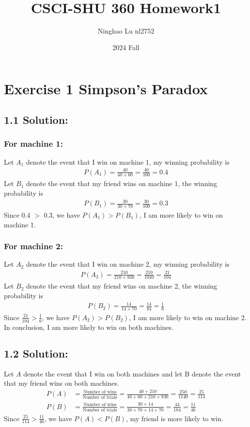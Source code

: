 \documentclass{article}
\title{CSCI-SHU 360 Homework1}
\author{Ninghao Lu nl2752}
\date{2024 Fall}
\begin{document}
\maketitle

\section*{Exercise 1 Simpson's Paradox}
\subsection*{1.1 Solution:}
\subsubsection*{For machine 1:}
Let $A_1$ denote the event that I win on machine 1, my winning probability is 
\begin{align*}
    P(A_1) = \frac{40}{40 + 60} = \frac{40}{100} = 0.4
\end{align*}
Let $B_1$ denote the event that my friend wins on machine 1, the winning probability is 
\begin{align*}
    P(B_1) = \frac{30}{30 + 70} = \frac{30}{100} = 0.3
\end{align*}
Since 0.4 $>$ 0.3, we have $P(A_1) > P(B_1)$, I am more likely to win on machine 1.
\subsubsection*{For machine 2:}
Let $A_2$ denote the event that I win on machine 2, my winning probability is 
\begin{align*}
    P(A_2) = \frac{210}{210 + 830} = \frac{210}{1040} = \frac{21}{104}
\end{align*}
Let $B_2$ denote the event that my friend wins on machine 2, the winning probability is 
\begin{align*}
    P(B_2) = \frac{14}{14 + 70} = \frac{14}{84} = \frac{1}{6}
\end{align*}
Since $\frac{21}{104} > \frac{1}{6}$, we have $P(A_2) > P(B_2)$, I am more likely to win on machine 2.\\
In conclusion, I am more likely to win on both machines.

\subsection*{1.2 Solution:}
Let $A$ denote the event that I win on both machines and let B denote the event that my friend wins on both machines.
\begin{align*}
    P (A) &= \frac{\text{Number of wins}}{\text{Number of trials}} = \frac{40 + 210}{40 + 60 + 210 + 830} = \frac{250}{1140} = \frac{25}{114} \\
    P (B) &= \frac{\text{Number of wins}}{\text{Number of trials}} = \frac{30 + 14}{30 + 70 + 14 + 70} = \frac{44}{184} = \frac{11}{46} 
\end{align*} 
Since $\frac{25}{114} > \frac{11}{46}$, we have $P(A) < P(B)$, my friend is more likely to win. 
\end{document}
